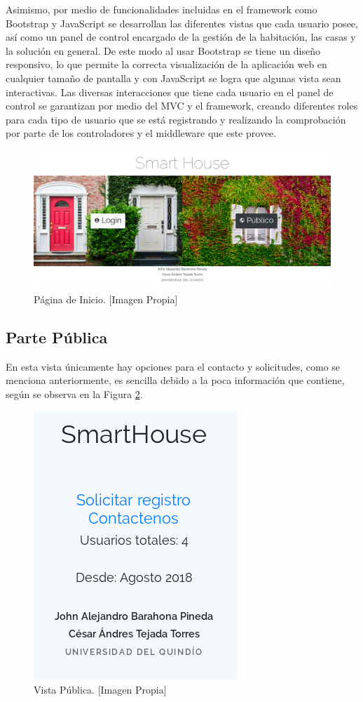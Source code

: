 Asimismo, por medio de funcionalidades incluidas en el framework como Bootstrap y JavaScript se desarrollan las diferentes vistas que cada usuario posee, así como un panel de control encargado de la gestión de la habitación, las casas y la solución en general. De este modo al usar Bootstrap se tiene un diseño responsivo, lo que permite la correcta visualización de la aplicación web en cualquier tamaño de pantalla y con JavaScript se logra que algunas vista sean interactivas. Las diversas interacciones que tiene cada usuario en el panel de control se garantizan por medio del MVC y el framework, creando diferentes roles para cada tipo de usuario que se está registrando y realizando la comprobación por parte de los controladores y el middleware que este provee.\\

\begin{figure}[H]
	\centering
	\caption[Página de Inicio.]{Página de Inicio. [Imagen Propia]}
	\label{fig:index}
	\includegraphics[width=0.5\linewidth]{Imagenes/Index}
\end{figure}

\subsection{Parte Pública}

En esta vista únicamente hay opciones para el contacto y solicitudes, como se menciona anteriormente, es sencilla debido a la poca información que contiene, según se observa en la Figura \ref{fig:publicview}.

\begin{figure}[H]
	\centering
	\caption[Vista Pública.]{Vista Pública. [Imagen Propia]}
	\label{fig:publicview}
	\includegraphics[width=0.25\linewidth]{Imagenes/Public_view}
\end{figure}

